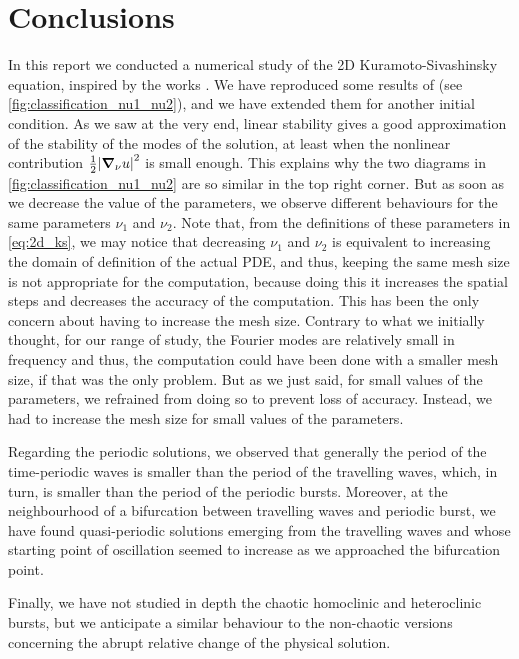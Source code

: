 \documentclass[twoside]{article}
\begin{document}
\section{Conclusions}
In this report we conducted a numerical study of the 2D Kuramoto-Sivashinsky equation, inspired by the works \cite{Kalogirou2015,phdthesis_anna}. We have reproduced some results of \cite{Kalogirou2015} (see \cref{fig:classification_nu1_nu2}), and we have extended them for another initial condition. As we saw at the very end, linear stability gives a good approximation of the stability of the modes of the solution, at least when the nonlinear contribution $\frac{1}{2}\abs{\grad_\nu u}^2$ is small enough. This explains why the two diagrams in \cref{fig:classification_nu1_nu2} are so similar in the top right corner. But as soon as we decrease the value of the parameters, we observe different behaviours for the same parameters $\nu_1$ and $\nu_2$. Note that, from the definitions of these parameters in \cref{eq:2d_ks}, we may notice that decreasing $\nu_1$ and $\nu_2$ is equivalent to increasing the domain of definition of the actual PDE, and thus, keeping the same mesh size is not appropriate for the computation, because doing this it increases the spatial steps and decreases the accuracy of the computation. This has been the only concern about having to increase the mesh size. Contrary to what we initially thought, for our range of study, the Fourier modes are relatively small in frequency and thus, the computation could have been done with a smaller mesh size, if that was the only problem. But as we just said, for small values of the parameters, we refrained from doing so to prevent loss of accuracy. Instead, we had to increase the mesh size for small values of the parameters.

Regarding the periodic solutions, we observed that generally the period of the time-periodic waves is smaller than the period of the travelling waves, which, in turn, is smaller than the period of the periodic bursts. Moreover, at the neighbourhood of a bifurcation between travelling waves and periodic burst, we have found quasi-periodic solutions emerging from the travelling waves and whose starting point of oscillation seemed to increase as we approached the bifurcation point.

Finally, we have not studied in depth the chaotic homoclinic and heteroclinic bursts, but we anticipate a similar behaviour to the non-chaotic versions concerning the abrupt relative change of the physical solution.
{}
\printbibliography
\end{document}
